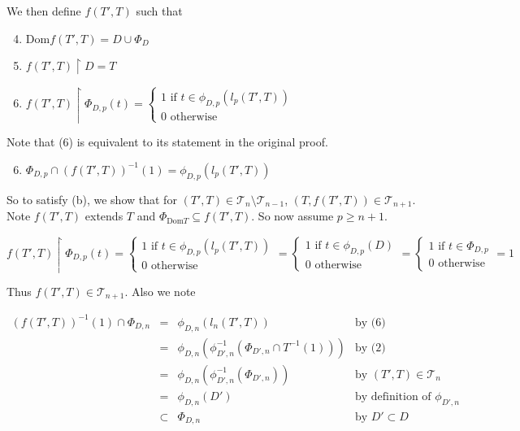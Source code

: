 \documentclass[12pt]{article}
\theoremstyle{plain}
\theoremstyle{definition}
\theoremstyle{remark}
\newcommand{\ds}{\displaystyle}
\begin{document}
We then define $f(T',T)$ such that

	\begin{enumerate}
	\setcounter{enumi}{3}
	\item $\textrm{Dom}f(T',T) = D \cup \Phi_D$
	\item $f(T',T) \restriction D = T$
	\item $\ds f(T',T) \restriction \Phi_{D,p}(t) = \left\{
\begin{array}{l}
1 \text{ if } t \in \phi_{D,p}(l_p(T',T)) \\
0 \text{ otherwise}
\end{array}
\right.$
	\end{enumerate}
	
Note that (6) is equivalent to its statement in the original proof.

	\begin{enumerate}
	\setcounter{enumi}{5}
	\item $\Phi_{D,p} \cap (f(T',T))^{-1}(1) = \phi_{D,p}(l_p(T',T))$
	\end{enumerate}

So to satisfy (b), we show that for $(T',T)\in\mathcal{T}_n\setminus\mathcal{T}_{n-1}$, $(T,f(T',T)) \in \mathcal{T}_{n+1}$. Note $f(T',T)$ extends $T$ and $\Phi_{\textrm{Dom} T} \subseteq f(T',T)$. So now assume $p \geq n+1$.

\[ 
f(T',T) \restriction \Phi_{D,p}(t) = \left\{
\begin{array}{l}
1 \text{ if } t \in \phi_{D,p}(l_p(T',T)) \\
0 \text{ otherwise}
\end{array}
\right.
=
\left\{
\begin{array}{l}
1 \text{ if } t \in \phi_{D,p}(D) \\
0 \text{ otherwise}
\end{array}
\right.
=
\left\{
\begin{array}{l}
1 \text{ if } t \in \Phi_{D,p} \\
0 \text{ otherwise}
\end{array}
\right.
= 1
\]

Thus $f(T',T) \in \mathcal{T}_{n+1}$.  Also we note

\[
\begin{array}{rcll}
(f(T',T))^{-1}(1)\cap\Phi_{D,n}
& = &
\phi_{D,n}(l_n(T',T))
&
\text{by (6)}
\\ & = &
\phi_{D,n}(\phi^{-1}_{D',n}(\Phi_{D',n}\cap T^{-1}(1)))
&
\text{by (2)}
\\ & = &
\phi_{D,n}(\phi^{-1}_{D',n}(\Phi_{D',n}))
&
\text{by }(T',T)\in\mathcal{T}_n
\\ & = &
\phi_{D,n}(D')
&
\text{by definition of }\phi_{D',n}
\\ & \subset &
\Phi_{D,n}
&
\text{by } D' \subset D
\end{array}
\]
\end{document}
